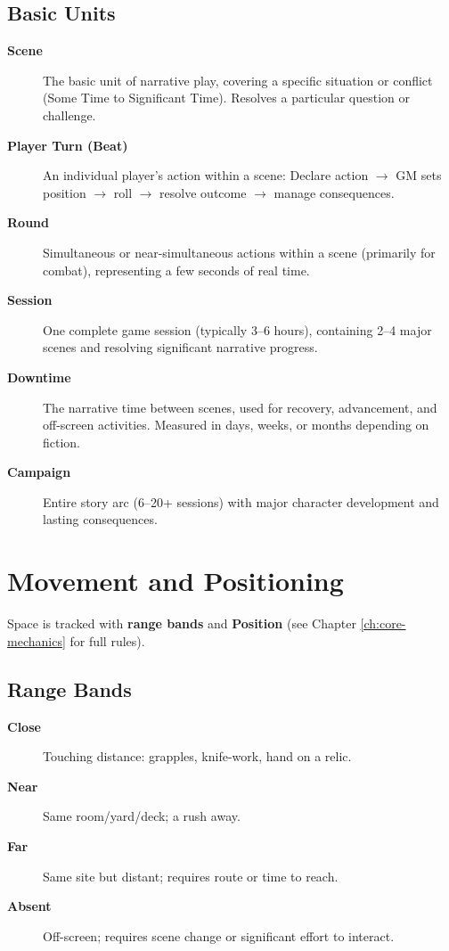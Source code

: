 \subsection*{Basic Units}
\label{sec:time-units}
\begin{description}
\item[\textbf{Scene}]  The basic unit of narrative play, covering a specific situation or conflict (Some Time to Significant Time). Resolves a particular question or challenge.
\item[\textbf{Player Turn (Beat)}]  An individual player's action within a scene: Declare action $\rightarrow$ GM sets position $\rightarrow$ roll $\rightarrow$ resolve outcome $\rightarrow$ manage consequences.
\item[\textbf{Round}]  Simultaneous or near-simultaneous actions within a scene (primarily for combat), representing a few seconds of real time.
\item[\textbf{Session}]  One complete game session (typically 3--6 hours), containing 2--4 major scenes and resolving significant narrative progress.
\item[\textbf{Downtime}]  The narrative time between scenes, used for recovery, advancement, and off-screen activities. Measured in days, weeks, or months depending on fiction.
\item[\textbf{Campaign}]  Entire story arc (6--20+ sessions) with major character development and lasting consequences.
\end{description}

\section{Movement and Positioning}
\label{sec:movement-positioning}

Space is tracked with \textbf{range bands} and \textbf{Position} (see Chapter \ref{ch:core-mechanics} for full rules).

\subsection*{Range Bands}
\begin{description}
\item[\textbf{Close}]  Touching distance: grapples, knife-work, hand on a relic.
\item[\textbf{Near}]  Same room/yard/deck; a rush away.
\item[\textbf{Far}]  Same site but distant; requires route or time to reach.
\item[\textbf{Absent}]  Off-screen; requires scene change or significant effort to interact.
\end{description}

